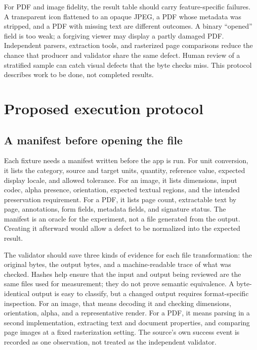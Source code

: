 \documentclass[10pt,letterpaper]{article}
\begin{document}
For PDF and image fidelity, the result table should carry feature-specific failures. A transparent icon flattened to an opaque JPEG, a PDF whose metadata was stripped, and a PDF with missing text are different outcomes. A binary ``opened'' field is too weak; a forgiving viewer may display a partly damaged PDF. Independent parsers, extraction tools, and rasterized page comparisons reduce the chance that producer and validator share the same defect. Human review of a stratified sample can catch visual defects that the byte checks miss. This protocol describes work to be done, not completed results.

\section{Proposed execution protocol}

\subsection{A manifest before opening the file}

Each fixture needs a manifest written before the app is run. For unit conversion, it lists the category, source and target units, quantity, reference value, expected display locale, and allowed tolerance. For an image, it lists dimensions, input codec, alpha presence, orientation, expected textual regions, and the intended preservation requirement. For a PDF, it lists page count, extractable text by page, annotations, form fields, metadata fields, and signature status. The manifest is an oracle for the experiment, not a file generated from the output. Creating it afterward would allow a defect to be normalized into the expected result.

The validator should save three kinds of evidence for each file transformation: the original bytes, the output bytes, and a machine-readable trace of what was checked. Hashes help ensure that the input and output being reviewed are the same files used for measurement; they do not prove semantic equivalence. A byte-identical output is easy to classify, but a changed output requires format-specific inspection. For an image, that means decoding it and checking dimensions, orientation, alpha, and a representative render. For a PDF, it means parsing in a second implementation, extracting text and document properties, and comparing page images at a fixed rasterization setting. The source's own success event is recorded as one observation, not treated as the independent validator.
\end{document}
